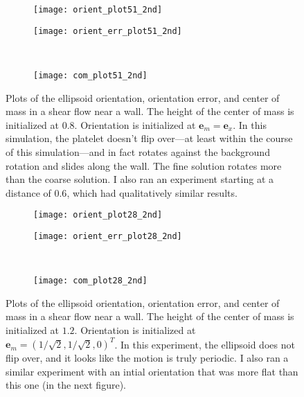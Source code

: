 \documentclass{article}
\newcommand{\vect}[1]{\boldsymbol{\mathbf{#1}}}
\begin{document}
\begin{figure}[h!]
  \centering
  \begin{subfigure}{0.49\textwidth}
    \texttt{[image: orient\_plot51\_2nd]}
  \end{subfigure}
  \hfill
  \begin{subfigure}{0.49\textwidth}
    \texttt{[image: orient\_err\_plot51\_2nd]}
  \end{subfigure}
  \\
  \begin{subfigure}{0.49\textwidth}
    \texttt{[image: com\_plot51\_2nd]}
  \end{subfigure}
  \caption{Plots of the ellipsoid orientation, orientation error, and
     center of mass in a shear flow near a wall. The height of the
     center of mass is initialized at $0.8$. Orientation is initialized
     at $\vect{e}_m = \vect{e}_x$. In this simulation, the platelet
     doesn't flip over---at least within the course of this
     simulation---and in fact rotates against the background
     rotation and slides along the wall. The fine solution rotates
     more than the coarse solution. I also ran an experiment starting
     at a distance of $0.6$, which had qualitatively similar results.}
  \label{fig:plt51}
\end{figure}

\begin{figure}[h!]
  \centering
  \begin{subfigure}{0.49\textwidth}
    \texttt{[image: orient\_plot28\_2nd]}
  \end{subfigure}
  \hfill
  \begin{subfigure}{0.49\textwidth}
    \texttt{[image: orient\_err\_plot28\_2nd]}
  \end{subfigure}
  \\
  \begin{subfigure}{0.49\textwidth}
    \texttt{[image: com\_plot28\_2nd]}
  \end{subfigure}
  \caption{Plots of the ellipsoid orientation, orientation error, and
     center of mass in a shear flow near a wall. The height of the
     center of mass is initialized at $1.2$. Orientation is initialized
     at $\vect{e}_m = (1/\sqrt{2}, 1/\sqrt{2}, 0)^T$. In this
     experiment, the ellipsoid does not flip over, and it looks like
     the motion is truly periodic. I also ran a similar experiment
     with an intial orientation that was more flat than this one (in
     the next figure).}
  \label{fig:plt28}
\end{figure}
\end{document}
